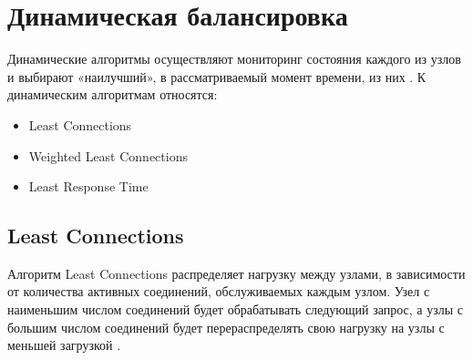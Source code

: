 \begin{comment}
При использовании статической балансировки узлы настраиваются по разному \cite{mainsource}:
\begin{enumerate}[label=---]
	\item По равномерному распределению нагрузки --- каждый узел получает аналогичное количество запросов.
	\item По приоритету --- выделенные узлы имеют больший приоритет и получают больше запросов.
	\item По типу запроса --- различные типы запросов могут быть отправлены на разные узлы для оптимизации обработки.
\end{enumerate}

\begin{comment}

Процесс работы статической балансировки выглядит следующим образом:
\begin{enumerate}[label=---]
	\item Балансировщик нагрузки получает запрос от клиента.
	\item Балансировщик принимает решение о том, на какой сервер направить запрос, основываясь на предварительных настройках.
	\item Балансировщик перенаправляет запрос на выбранный сервер.
	\item Сервер обрабатывает запрос и отправляет ответ клиенту через балансировщик.
\end{enumerate}
\end{comment}

\section{Динамическая балансировка}

Динамические алгоритмы осуществляют мониторинг состояния каждого из узлов и выбирают «наилучший», в рассматриваемый момент времени, из них \cite{drr}. К динамическим алгоритмам относятся:
\begin{itemize}
	\item Least Connections
	\item Weighted Least Connections
	\item Least Response Time
\end{itemize}

\subsection{Least Connections}

Алгоритм Least Connections распределяет нагрузку между узлами, в зависимости от количества активных соединений, обслуживаемых каждым узлом.
Узел с наименьшим числом соединений будет обрабатывать следующий запрос, а узлы с большим числом соединений будет перераспределять свою нагрузку на узлы с меньшей загрузкой \cite{leastconnection}.


